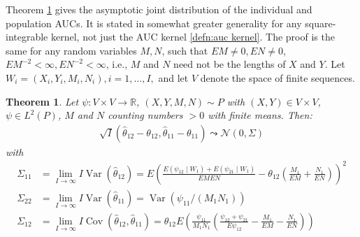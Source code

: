 \documentclass[12pt]{article}
\DeclareMathOperator{\AUC}{AUC}
\DeclareMathOperator{\V}{Var}
\DeclareMathOperator{\cov}{Cov}
\newcommand{\I}{I}
\newcommand{\E}{E}
\renewcommand{\P}{P}
\newcommand{\cind}{\perp \!\!\! \perp}
\newcommand{\aucindiv}{\theta_{11}}%
\newcommand{\aucpop}{\theta_{12}}%
\newcommand{\aucindivhat}{\hat{\theta}_{11}}%
\newcommand{\aucpophat}{\hat{\theta}_{12}}%
\newcommand{\Kernel}{\psi}
\newcommand{\W}[1]{W_{#1}}
\newcommand{\seqspace}{V}%
\newtheorem{theorem}{Theorem}
\begin{document}
Theorem \ref{theorem:asymptotic} gives the asymptotic joint
distribution of the individual and population AUCs. It is stated in
somewhat greater generality for any square-integrable kernel, not just
the AUC kernel \eqref{defn:auc kernel}. The proof is the same for any
random variables $M,N$, such that $\E M\neq 0, \E N\neq 0$,
$\E M^{-2}<\infty,\E N^{-2}<\infty$, i.e., $M$ and $N$ need not be the
lengths of $X$ and $Y$.  Let $\W{i}=(X_i,Y_i,M_i,N_i),i=1,\ldots,\I,$ and let $\seqspace$ denote the space of finite sequences.
\begin{theorem}\label{theorem:asymptotic} Let $\psi:V\times V\to\mathbb{R}$, $(X,Y,M,N)\sim\P$ with $(X,Y)\in V\times V$, $\psi\in L^2(\P)$, $M$ and $N$ counting numbers $> 0$ with finite means. Then:
  \begin{align}
    \sqrt{\I}(\aucpophat-\aucpop,\aucindivhat-\aucindiv) \leadsto \mathcal{N}(0,\Sigma)
  \end{align}
  with
  \begin{align}
    \Sigma_{11} &= \lim_{\I\to\infty} \I\V(\aucpophat) =
    \E\left(\frac{\E(\Kernel_{12}\mid\W{1})+\E(\Kernel_{21}\mid\W{1})}{\E M\E N} - \aucpop\left(\frac{M_1}{\E M} + \frac{N_1}{\E N}\right)   \right)^2
    \\
    \Sigma_{22} &= \lim_{\I\to\infty} \I\V(\aucindivhat) =
    \V(\Kernel_{11}/(M_1N_1))
    \\
    \Sigma_{12} &= \lim_{\I\to\infty} \I\cov(\aucpophat,\aucindivhat) =
    \aucpop\E\left(\frac{\Kernel_{11}}{M_1N_1}\left(\frac{\Kernel_{12}+\Kernel_{21}}{\E\Kernel_{12}} - \frac{M_1}{\E M}-\frac{N_1}{\E N}  \right) \right)
  \end{align}
\end{theorem}
\end{document}
